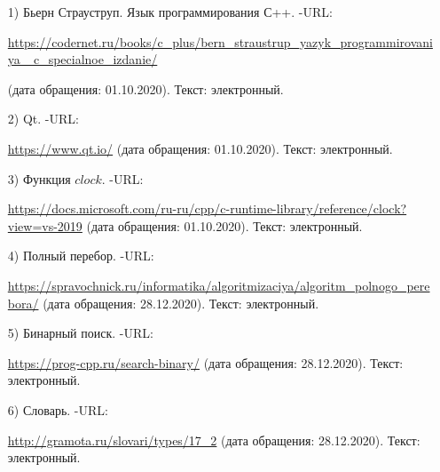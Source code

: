 \documentclass[14pt, a4paper]{extarticle}
\begin{document}
	\begin{enumerate}
		\label{CPlusPlus}
		\item[1)] Бьерн Страуструп. Язык программирования С++. -URL:\par 
		\href{https://codernet.ru/books/c_plus/bern_straustrup_yazyk_programmirovaniya_c_specialnoe_izdanie/}
		{https://codernet.ru/books/c\_plus/bern\_straustrup\_yazyk\_programmirovaniya\_
			c\_specialnoe\_izdanie/}\par(дата обращения:
		01.10.2020). Текст: электронный.
		
		\label{Cute}
		\item[2)] Qt. -URL:\par
		\href{https://www.qt.io/}{https://www.qt.io/} (дата обращения: 01.10.2020). Текст: электронный.
		
		\label{CLOCK}
		\item[3)] Функция $clock$. -URL:\par
		\href{https://docs.microsoft.com/ru-ru/cpp/c-runtime-library/reference/clock?view=vs-2019}{https://docs.microsoft.com/ru-ru/cpp/c-runtime-library/reference/clock?view=vs-2019} (дата обращения:
		01.10.2020). Текст: электронный.
		
		\item[4)] Полный перебор. -URL:\par
		\href{https://spravochnick.ru/informatika/algoritmizaciya/algoritm_polnogo_perebora/}{https://spravochnick.ru/informatika/algoritmizaciya/algoritm\_polnogo\_perebora/} (дата обращения:
		28.12.2020). Текст: электронный.
		
		\item[5)] Бинарный поиск. -URL:\par
		\href{https://prog-cpp.ru/search-binary/}{https://prog-cpp.ru/search-binary/} (дата обращения: 28.12.2020). Текст: электронный.
		
		\item[6)] Словарь. -URL:\par
		\href{http://gramota.ru/slovari/types/17_2}{http://gramota.ru/slovari/types/17\_2} (дата обращения: 28.12.2020). Текст: электронный.	
		
	\end{enumerate}
	\label{Litre}	
	
\end{document}
